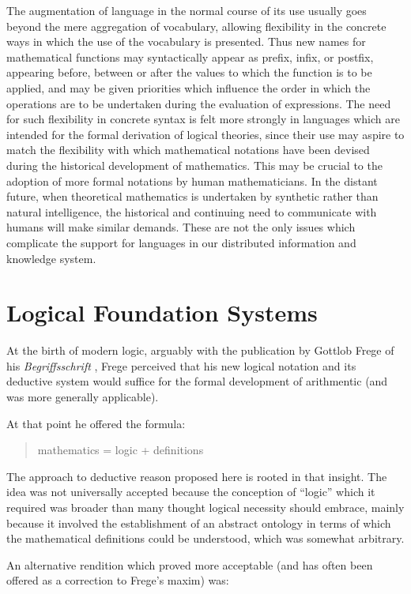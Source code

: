 \documentclass[10pt,titlepage]{article}
\begin{document}
The augmentation of language in the normal course of its use usually goes beyond the mere aggregation of vocabulary, allowing flexibility in the concrete ways in which the use of the vocabulary is presented.
Thus new names for mathematical functions may syntactically appear as prefix, infix, or postfix, appearing before, between or after the values to which the function is to be applied, and may be given priorities which influence the order in which the operations are to be undertaken during the evaluation of expressions.
The need for such flexibility in concrete syntax is felt more strongly in languages which are intended for the formal derivation of logical theories, since their use may aspire to match the flexibility with which mathematical notations have been devised during the historical development of mathematics.
This may be crucial to the adoption of more formal notations by human mathematicians.
In the distant future, when theoretical mathematics is undertaken by synthetic rather than natural intelligence, the historical and continuing need to communicate with humans will make similar demands.
These are not the only issues which complicate the support for languages in our distributed information and knowledge system.

\section{Logical Foundation Systems}

At the birth of modern logic, arguably with the publication by Gottlob Frege of his \emph{Begriffsschrift} \cite{frege1879}, Frege perceived that his new logical notation and its deductive system would suffice for the formal development of arithmentic (and was more generally applicable).

At that point he offered the formula:

\begin{quote}
  mathematics = logic + definitions
\end{quote}

The approach to deductive reason proposed here is rooted in that insight.
The idea was not universally accepted because the conception of ``logic'' which it required was broader than many thought logical necessity should embrace, mainly because it involved the establishment of an abstract ontology in terms of which the mathematical definitions could be understood, which was somewhat arbitrary.

An alternative rendition which proved more acceptable (and has often been offered as a correction to Frege's maxim) was:
\end{document}
